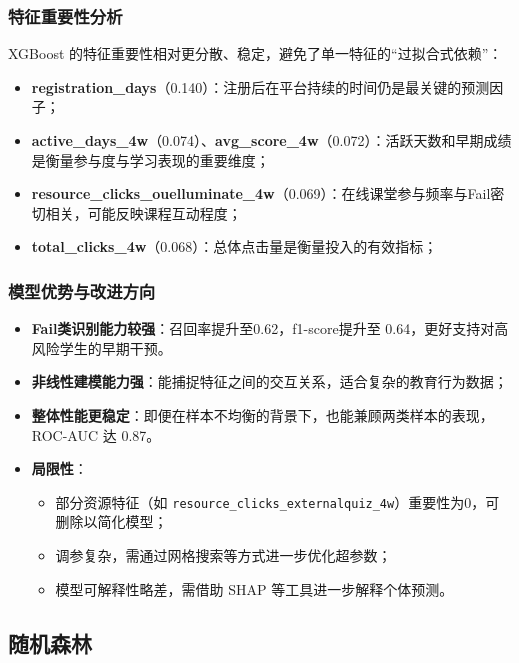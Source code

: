 \documentclass{SYSUReport}
\begin{document}
\subsubsection{特征重要性分析}

XGBoost 的特征重要性相对更分散、稳定，避免了单一特征的“过拟合式依赖”：

\begin{itemize}
    \item \textbf{registration\_days}（0.140）：注册后在平台持续的时间仍是最关键的预测因子；
    \item \textbf{active\_days\_4w}（0.074）、\textbf{avg\_score\_4w}（0.072）：活跃天数和早期成绩是衡量参与度与学习表现的重要维度；
    \item \textbf{resource\_clicks\_ouelluminate\_4w}（0.069）：在线课堂参与频率与Fail密切相关，可能反映课程互动程度；
    \item \textbf{total\_clicks\_4w}（0.068）：总体点击量是衡量投入的有效指标；
\end{itemize}


\subsubsection{模型优势与改进方向}

\begin{itemize}
    \item \textbf{Fail类识别能力较强}：召回率提升至0.62，f1-score提升至 0.64，更好支持对高风险学生的早期干预。
    \item \textbf{非线性建模能力强}：能捕捉特征之间的交互关系，适合复杂的教育行为数据；
    \item \textbf{整体性能更稳定}：即便在样本不均衡的背景下，也能兼顾两类样本的表现，ROC-AUC 达 0.87。
    \item \textbf{局限性}：
    \begin{itemize}
        \item 部分资源特征（如 \texttt{resource\_clicks\_externalquiz\_4w}）重要性为0，可删除以简化模型；
        \item 调参复杂，需通过网格搜索等方式进一步优化超参数；
        \item 模型可解释性略差，需借助 SHAP 等工具进一步解释个体预测。
    \end{itemize}
\end{itemize}


\subsection{随机森林}
\end{document}
